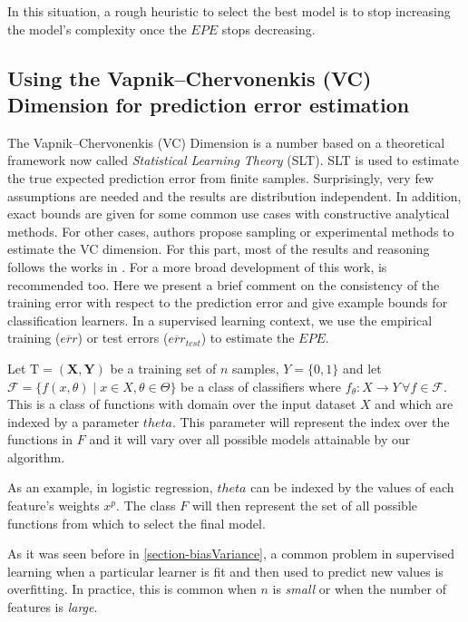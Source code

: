 In this situation, a rough heuristic to select the best model is to stop increasing the model's complexity once the $EPE$ stops decreasing.

\subsection{ Using the Vapnik--Chervonenkis (VC) Dimension for prediction error estimation} \label{section-VcDimension}


The Vapnik--Chervonenkis (VC) Dimension is a number based on a theoretical framework now called \textit{Statistical Learning Theory} (SLT). SLT is used to estimate the true expected prediction error from finite samples. Surprisingly, very few assumptions are needed and the results are distribution independent. In addition, exact bounds are given for some common use cases with constructive analytical methods. For other cases, authors propose sampling or experimental methods to estimate the VC dimension. For this part, most of the results and reasoning follows the works in \textcite{cherkassky-learning2007}. For a more broad development of this work, \textcite{vapnik-nature2013} is recommended too. Here we present a brief comment on the consistency of the training error with respect to the prediction error and give example bounds for classification learners. In a supervised learning context, we use the empirical training ($\overline{err}$) or test errors ($\overline{err}_{test}$) to estimate the $EPE$.

Let $\mathrm{T} = (\textbf{X},\textbf{Y})$ be a training set of $n$ samples, $Y = \{0,1 \}$ and let $\mathcal {F} = \{f(x,\theta) \mid x \in X, \theta \in \Theta\}$ be a class of classifiers where $f_\theta: X \rightarrow Y \, \forall f \in \mathcal {F}$. This is a class of functions with domain over the input dataset $X$ and which are indexed by a parameter $theta$. This parameter will represent the index over the functions in $F$ and it will vary over all possible models attainable by our algorithm.

As an example, in logistic regression, $theta$ can be indexed by the values of each feature's weights $x^p$. The class $F$ will then represent the set of all possible functions from which to select the final model.

As it was seen before in \ref{section-biasVariance}, a common problem in supervised learning when a particular learner is fit and then used to predict new values is overfitting. In practice, this is common when $n$ is \textit{small} or when the number of features is \textit{large}.


